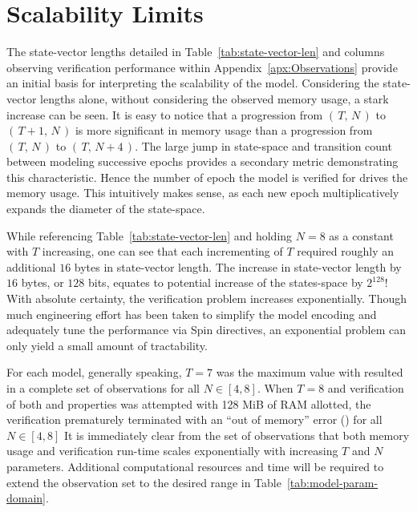 \hypertarget{sec:scalability-limits}{%
\section{Scalability Limits}\label{sec:scalability-limits}}

The state-vector lengths detailed in Table\ \ref{tab:state-vector-len} and columns observing verification performance within Appendix\ \ref{apx:Observations} provide an initial basis for interpreting the scalability of the  model.
Considering the state-vector lengths alone, without considering the observed memory usage, a stark increase can be seen.
It is easy to notice that a progression from \( (\,T,\, N\,) \) to \( (\,T+1,\, N\,) \) is more significant in memory usage than a progression from \( (\,T,\, N\,) \) to \( (\,T,\, N+4\,) \).
The large jump in state-space and transition count between modeling successive epochs provides a secondary metric demonstrating this characteristic.
Hence the number of epoch the model is verified for drives the memory usage.
This intuitively makes sense, as each new epoch multiplicatively expands the diameter of the state-space.

While referencing Table\ \ref{tab:state-vector-len} and holding \(N = 8\) as a constant with \(T\) increasing, one can see that each incrementing of \(T\) required roughly an additional \(16\) bytes in state-vector length.
The increase in state-vector length by \(16\) bytes, or \(128\) bits, equates to potential increase of the states-space by \(2^{128}\)!
With absolute certainty, the verification problem increases exponentially.
Though much engineering effort has been taken to simplify the model encoding and adequately tune the performance via Spin directives, an exponential problem can only yield a small amount of tractability.

For each model, generally speaking, \(T = 7\) was the maximum value with resulted in a complete set of observations for all \(N \in [4, 8]\).
When \(T = 8\) and verification of both  and  properties was attempted with 128 MiB of RAM allotted, the verification prematurely terminated with an ``out of memory'' error (\OutOfMemory) for all \(N \in [4, 8]\)
It is immediately clear from the set of observations that both memory usage and verification run-time scales exponentially with increasing \(T\) and \(N\) parameters.
Additional computational resources and time will be required to extend the observation set to the desired range in Table\ \ref{tab:model-param-domain}.

